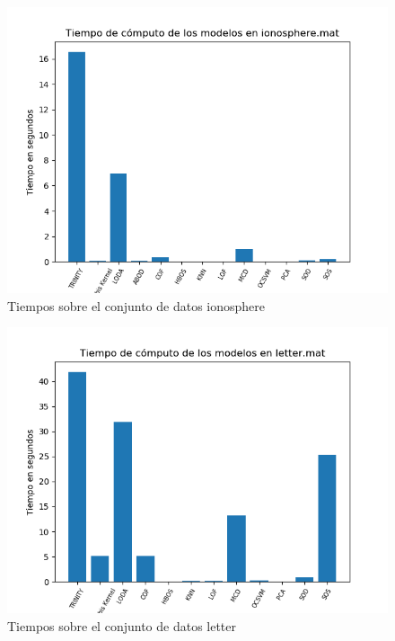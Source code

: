 \begin{figure}[H]
	\centering
	\label{ionosphere_times}
	\includegraphics[scale=0.7]{imagenes/imgs-exp1/times/ionosphere}
	\caption{Tiempos sobre el conjunto de datos ionosphere}
\end{figure}

\begin{figure}[H]
	\centering
	\label{letter_times}
	\includegraphics[scale=0.7]{imagenes/imgs-exp1/times/letter}
	\caption{Tiempos sobre el conjunto de datos letter}
\end{figure}

